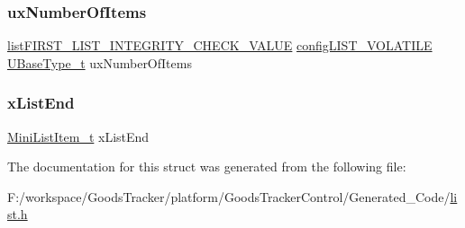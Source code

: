 \mbox{\label{structx_l_i_s_t_a17b9828dd40520fcda9127b4cb4c0c0c}} 
\subsubsection{\texorpdfstring{ux\+Number\+Of\+Items}{uxNumberOfItems}}
{\footnotesize\ttfamily \hyperlink{list_8h_a3a52b5a4f70d3a07e37a5814a23ba880}{list\+F\+I\+R\+S\+T\+\_\+\+L\+I\+S\+T\+\_\+\+I\+N\+T\+E\+G\+R\+I\+T\+Y\+\_\+\+C\+H\+E\+C\+K\+\_\+\+V\+A\+L\+UE} \hyperlink{list_8h_a2d5de557c5561c8980d1bf51d87d8cba}{config\+L\+I\+S\+T\+\_\+\+V\+O\+L\+A\+T\+I\+LE} \hyperlink{portmacro_8h_a646f89d4298e4f5afd522202b11cb2e6}{U\+Base\+Type\+\_\+t} ux\+Number\+Of\+Items}

\mbox{\label{structx_l_i_s_t_a83a65be4e3a2bb70855742896126bf63}} 
\subsubsection{\texorpdfstring{x\+List\+End}{xListEnd}}
{\footnotesize\ttfamily \hyperlink{list_8h_a542a8d55e98bc407593979e61f83cd02}{Mini\+List\+Item\+\_\+t} x\+List\+End}



The documentation for this struct was generated from the following file\+:\begin{DoxyCompactItemize}
\item 
F\+:/workspace/\+Goods\+Tracker/platform/\+Goods\+Tracker\+Control/\+Generated\+\_\+\+Code/\hyperlink{list_8h}{list.\+h}\end{DoxyCompactItemize}
